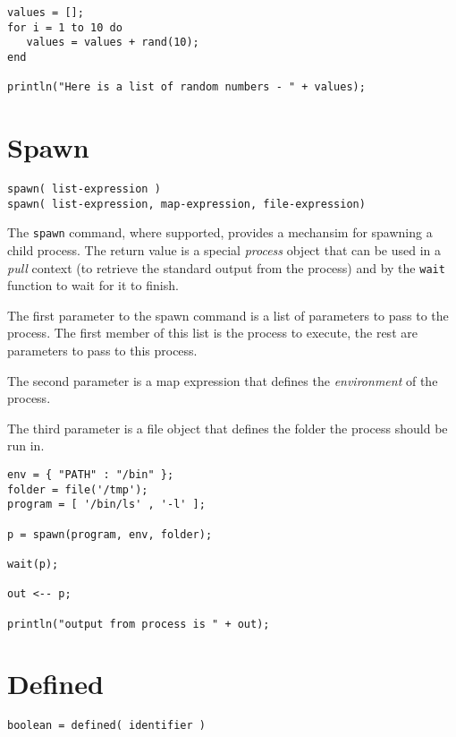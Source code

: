 \begin{lstlisting}[caption={Rand example}]
values = [];
for i = 1 to 10 do
   values = values + rand(10);
end

println("Here is a list of random numbers - " + values);

\end{lstlisting}

\section{Spawn}

\begin{Verbatim}
spawn( list-expression )
spawn( list-expression, map-expression, file-expression) 
\end{Verbatim}

The \Verb+spawn+ command, where supported, provides a mechansim for spawning a child process. The return value is a special \emph{process} object that can be used in a \emph{pull} context (to retrieve the standard output from the process) and by the \verb+wait+ function to wait for it to finish.

The first parameter to the spawn command is a list of parameters to pass to the process. The first member of this list is the process to execute, the rest are parameters to pass to this process.

The second parameter is a map expression that defines the \emph{environment} of the process. 

The third parameter is a file object that defines the folder the process should be run in.

\begin{lstlisting}[caption={Spawn example}]
env = { "PATH" : "/bin" };
folder = file('/tmp');
program = [ '/bin/ls' , '-l' ];

p = spawn(program, env, folder);

wait(p);

out <-- p;

println("output from process is " + out);
\end{lstlisting}

\section{Defined}

\begin{Verbatim}
boolean = defined( identifier )
\end{Verbatim}

